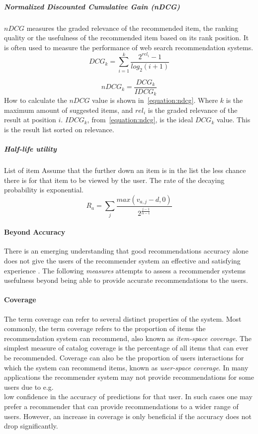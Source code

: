 \subparagraph{Normalized Discounted Cumulative Gain (nDCG)}
\label{subp:normalized_discounted_cumulative_gain_}
$nDCG$ measures the graded relevance of the recommended item, the ranking quality or the usefulness of the recommended item based on its rank position.
It is often used to measure the performance of web search recommendation systems.
\begin{equation}
    DCG_k = \sum_{i=1}^{k}{\frac{2^{rel_i}-1}{log_2(i+1)}}
    \label{equation:dcg}
\end{equation}

\begin{equation}
    nDCG_k = \frac{DCG_k}{IDCG_k}
    \label{equation:ndcg}
\end{equation}
How to calculate the $nDCG$ value is shown in~\ref{equation:ndcg}.
Where $k$ is the maximum amount of suggested items, and $rel_i$ is the graded relevance of the result at position $i$.
$IDCG_k$, from~\ref{equation:ndcg}, is the ideal $DCG_k$ value.
This is the result list sorted on relevance.

\subparagraph{Half-life utility~\cite{Breese:1998:EAP:2074094.2074100}}
List of item
Assume that the further down an item is in the list the less chance there is for that item to be viewed by the user.
The rate of the decaying probability is exponential.
\begin{equation}
	R_a = \sum_{j}{\frac{max(v_{a,j}-d,0)}{2^{\frac{j-1}{\alpha-1}}}}
\end{equation}




\paragraph{Beyond Accuracy}
There is an emerging understanding that good recommendations accuracy alone does not give the users of the recommender system an effective and satisfying experience \cite{Herlocker2004}. The following \emph{measures} attempts to assess a recommender systems usefulness beyond being able to provide accurate recommendations to the users.

\paragraph{Coverage}
The term coverage can refer to several distinct properties of the system. Most
commonly, the term coverage refers to the proportion of items the
recommendation system can recommend, also known as \emph{item-space coverage}.
The simplest measure of catalog coverage is the percentage of all items that
can ever be recommended. Coverage can also be the proportion of users
interactions for which the system can recommend items, known as
\emph{user-space coverage}. In many applications the recommender system may not
provide recommendations for some users due to e.g.\\ low confidence in the
accuracy of predictions for that user. In such cases one may prefer a
recommender that can provide recommendations to a wider range of users. However, an increase in coverage is only beneficial if the accuracy does not drop significantly.


